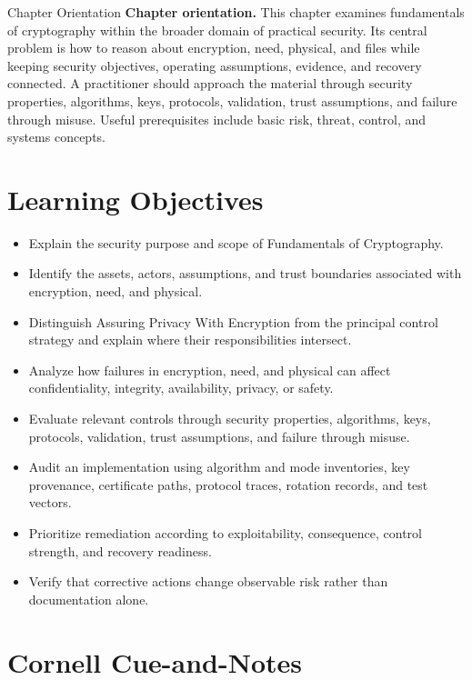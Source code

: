 \documentclass[11pt,letterpaper]{article}
\title{\CornellDocumentTitle}
\author{}
\date{}
\begin{document}
\maketitle
\begin{CornellOverviewBox}{Chapter Orientation}
\textbf{Chapter orientation.} This chapter examines fundamentals of cryptography within the broader domain of practical security. Its central problem is how to reason about encryption, need, physical, and files while keeping security objectives, operating assumptions, evidence, and recovery connected. A practitioner should approach the material through security properties, algorithms, keys, protocols, validation, trust assumptions, and failure through misuse. Useful prerequisites include basic risk, threat, control, and systems concepts.
\end{CornellOverviewBox}
\section*{Learning Objectives}
\begin{itemize}
\item Explain the security purpose and scope of Fundamentals of Cryptography.
\item Identify the assets, actors, assumptions, and trust boundaries associated with encryption, need, and physical.
\item Distinguish Assuring Privacy With Encryption from the principal control strategy and explain where their responsibilities intersect.
\item Analyze how failures in encryption, need, and physical can affect confidentiality, integrity, availability, privacy, or safety.
\item Evaluate relevant controls through security properties, algorithms, keys, protocols, validation, trust assumptions, and failure through misuse.
\item Audit an implementation using algorithm and mode inventories, key provenance, certificate paths, protocol traces, rotation records, and test vectors.
\item Prioritize remediation according to exploitability, consequence, control strength, and recovery readiness.
\item Verify that corrective actions change observable risk rather than documentation alone.
\end{itemize}
\section*{Cornell Cue-and-Notes}
\end{document}

